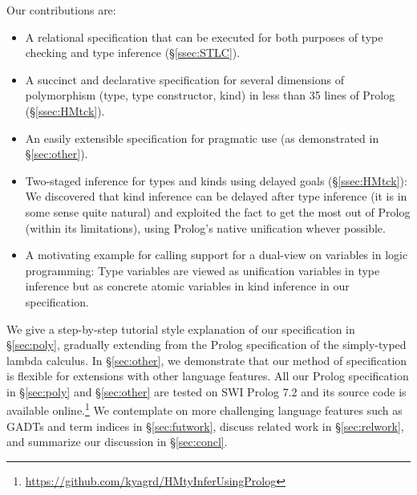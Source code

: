 Our contributions are:
\begin{itemize}\vspace*{-1ex}
\item A relational specification that can be executed for
	both purposes of type checking and type inference (\S\ref{ssec:STLC}).
\item A succinct and declarative specification for several dimensions of
	polymorphism (type, type constructor, kind) in less than 35 lines
	of Prolog (\S\ref{ssec:HMtck}).
\item An easily extensible specification for pragmatic use
	(as demonstrated in \S\ref{sec:other}).
\item Two-staged inference for types and kinds using delayed goals
	(\S\ref{ssec:HMtck}):
We discovered that kind inference can be delayed after type inference
(it is in some sense quite natural) and exploited the fact to get the
most out of Prolog (within its limitations), using Prolog's
native unification whever possible.
\item A motivating example for calling support for a dual-view
	on variables in logic programming:
Type variables are viewed as unification variables
in type inference but as concrete atomic variables
in kind inference in our specification.
\end{itemize}

We give a step-by-step tutorial style explanation of our specification in
\S\ref{sec:poly}, gradually extending from the Prolog specification of
the simply-typed lambda calculus. In \S\ref{sec:other}, we demonstrate
that our method of specification is flexible for extensions with
other language features. All our Prolog specification in \S\ref{sec:poly}
and \S\ref{sec:other} are tested on SWI Prolog 7.2 and its source code is
available online.\footnote{
	\url{https://github.com/kyagrd/HMtyInferUsingProlog} }
We contemplate on more challenging language features such as GADTs and
term indices in \S\ref{sec:futwork}, discuss related work in
\S\ref{sec:relwork}, and summarize our discussion in \S\ref{sec:concl}.

